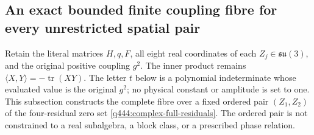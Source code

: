 \subsection{An exact bounded finite coupling fibre for every unrestricted spatial pair}
\label{q444:finite-coupling-section}

Retain the literal matrices $H,q,F$, all eight real coordinates of each
$Z_j\in\mathfrak{su}(3)$, and the original positive coupling $g^2$.
The inner product remains $\langle X,Y\rangle=-\operatorname{tr}(XY)$.
The letter $t$ below is a polynomial indeterminate whose evaluated value is
the original $g^2$; no physical constant or amplitude is set to one.
This subsection constructs the complete fibre over a fixed ordered pair
$(Z_1,Z_2)$ of the four-residual zero set
\eqref{q444:complex-full-residuals}. The ordered pair is not constrained
to a real subalgebra, a block class, or a prescribed phase relation.

